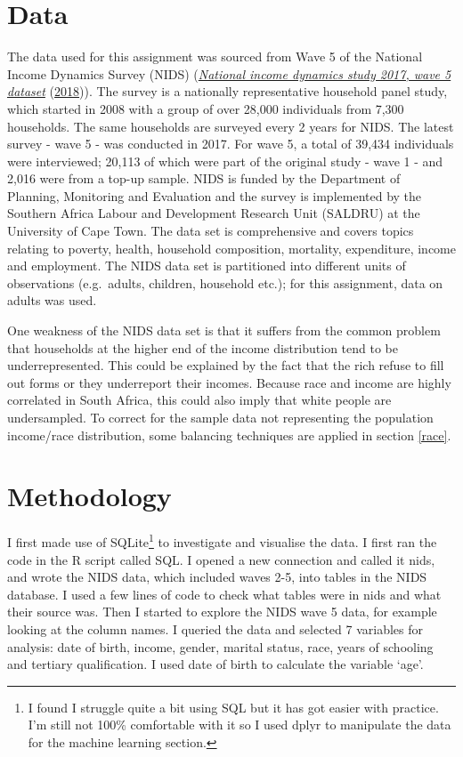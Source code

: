 \documentclass[11pt,preprint, authoryear]{elsarticle}
\numberwithin{equation}{section}
\numberwithin{figure}{section}
\numberwithin{table}{section}
\let\rmarkdownfootnote\footnote%
\def\footnote{\protect\rmarkdownfootnote}
\begin{document}
\hypertarget{data}{%
\section{\texorpdfstring{Data \label{Data}}{Data }}\label{data}}

The data used for this assignment was sourced from Wave 5 of the
National Income Dynamics Survey (NIDS)
(\protect\hyperlink{ref-nids}{\emph{National income dynamics study 2017,
wave 5 dataset}} (\protect\hyperlink{ref-nids}{2018})). The survey is a
nationally representative household panel study, which started in 2008
with a group of over 28,000 individuals from 7,300 households. The same
households are surveyed every 2 years for NIDS. The latest survey - wave
5 - was conducted in 2017. For wave 5, a total of 39,434 individuals
were interviewed; 20,113 of which were part of the original study - wave
1 - and 2,016 were from a top-up sample. NIDS is funded by the
Department of Planning, Monitoring and Evaluation and the survey is
implemented by the Southern Africa Labour and Development Research Unit
(SALDRU) at the University of Cape Town. The data set is comprehensive
and covers topics relating to poverty, health, household composition,
mortality, expenditure, income and employment. The NIDS data set is
partitioned into different units of observations (e.g.~adults, children,
household etc.); for this assignment, data on adults was used.

One weakness of the NIDS data set is that it suffers from the common
problem that households at the higher end of the income distribution
tend to be underrepresented. This could be explained by the fact that
the rich refuse to fill out forms or they underreport their incomes.
Because race and income are highly correlated in South Africa, this
could also imply that white people are undersampled. To correct for the
sample data not representing the population income/race distribution,
some balancing techniques are applied in section \ref{race}.

\hypertarget{methodology}{%
\section{\texorpdfstring{Methodology
\label{Meth}}{Methodology }}\label{methodology}}

I first made use of SQLite\footnote{I found I struggle quite a bit using
  SQL but it has got easier with practice. I'm still not 100\%
  comfortable with it so I used dplyr to manipulate the data for the
  machine learning section.} to investigate and visualise the data. I
first ran the code in the R script called SQL. I opened a new connection
and called it nids, and wrote the NIDS data, which included waves 2-5,
into tables in the NIDS database. I used a few lines of code to check
what tables were in nids and what their source was. Then I started to
explore the NIDS wave 5 data, for example looking at the column names. I
queried the data and selected 7 variables for analysis: date of birth,
income, gender, marital status, race, years of schooling and tertiary
qualification. I used date of birth to calculate the variable `age'.
\end{document}
